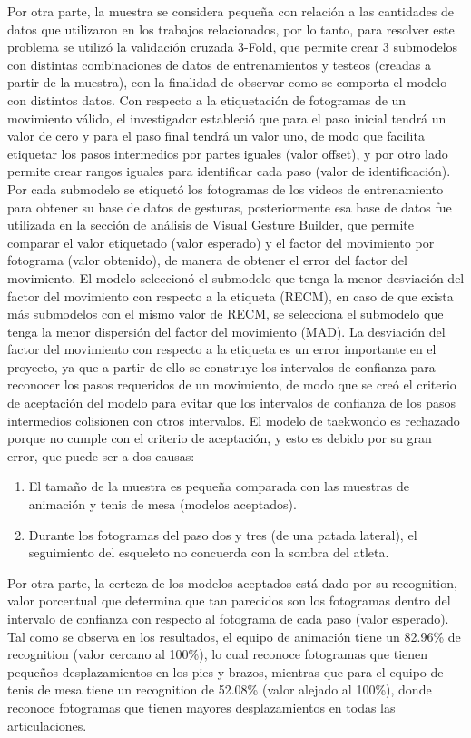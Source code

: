 \medbreak
Por otra parte, la muestra se considera peque\~na con relaci\'on a las cantidades de datos que utilizaron en los trabajos relacionados, por lo tanto, para resolver este problema se utiliz\'o la validaci\'on cruzada 3-Fold, que permite crear 3 submodelos con distintas combinaciones de datos de entrenamientos y testeos (creadas a partir de la muestra), con la finalidad de observar como se comporta el modelo con distintos datos.
\medbreak
Con respecto a la etiquetaci\'on de fotogramas de un movimiento v\'alido, el investigador estableci\'o que para el paso inicial tendr\'a un valor de cero y para el paso final tendr\'a un valor uno, de modo que facilita etiquetar los pasos intermedios por partes iguales (valor offset), y por otro lado permite crear rangos iguales para identificar cada paso (valor de identificaci\'on).
\medbreak
Por cada submodelo se etiquet\'o los fotogramas de los videos de entrenamiento para obtener su base de datos de gesturas, posteriormente esa base de datos fue utilizada en la secci\'on de an\'alisis de Visual Gesture Builder, que permite comparar el valor etiquetado (valor esperado) y el factor del movimiento por fotograma (valor obtenido), de manera de obtener el error del factor del movimiento.
\medbreak
El modelo seleccion\'o el submodelo que tenga la menor desviaci\'on del factor del movimiento con respecto a la etiqueta (RECM), en caso de que exista m\'as submodelos con el mismo valor de RECM, se selecciona el submodelo que tenga la menor dispersi\'on del factor del movimiento (MAD).
\medbreak
La desviaci\'on del factor del movimiento con respecto a la etiqueta es un error importante en el proyecto, ya que a partir de ello se construye los intervalos de confianza para reconocer los pasos requeridos de un movimiento, de modo que se cre\'o el criterio de aceptaci\'on del modelo para evitar que los intervalos de confianza de los pasos intermedios colisionen con otros intervalos.
\medbreak
El modelo de taekwondo es rechazado porque no cumple con el criterio de aceptaci\'on, y esto es debido por su gran error, que puede ser a dos causas:
\begin{enumerate}[1.]
\item El tama\~no de la muestra es peque\~na comparada con las muestras de animaci\'on y tenis de mesa (modelos aceptados).
\item Durante los fotogramas del paso dos y tres (de una patada lateral), el seguimiento del esqueleto no concuerda con la sombra del atleta.
\end{enumerate}
Por otra parte, la certeza de los modelos aceptados est\'a dado por su recognition, valor porcentual que determina que tan parecidos son los fotogramas dentro del intervalo de confianza con respecto al fotograma de cada paso (valor esperado). Tal como se observa en los resultados, el equipo de animaci\'on tiene un 82.96\% de recognition (valor cercano al 100\%), lo cual reconoce fotogramas que tienen peque\~nos desplazamientos en los pies y brazos, mientras que para el equipo de tenis de mesa tiene un recognition de 52.08\%  (valor alejado al 100\%), donde reconoce fotogramas que tienen mayores desplazamientos en todas las articulaciones.
